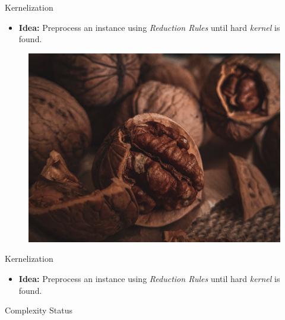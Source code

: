 \begin{frame}[c]{Kernelization}
\begin{itemize}
    \item \textbf{Idea: } Preprocess an instance using \textit{Reduction Rules} until hard \textit{kernel} is found.
\end{itemize}

\begin{figure}
\centering
\resizebox{0.35\textwidth}{!} {
\includegraphics{fig/pexels-yulia-ilina-10400351.jpg}
}
\end{figure}
\end{frame}


\begin{frame}[c]{Kernelization}



\begin{itemize}
    \item \textbf{Idea: } Preprocess an instance using \textit{Reduction Rules} until hard \textit{kernel} is found.
\end{itemize}

\begin{figure}
\centering
\resizebox{0.7\textwidth}{!}{
    
}
\end{figure}
\end{frame}


\begin{frame}[c]{Complexity Status}
 \begin{figure}
    \centering

    \makeatletter
    \resizebox{0.9\textwidth}{!}{
        
    }
    \makeatother
\end{figure}
\end{frame}